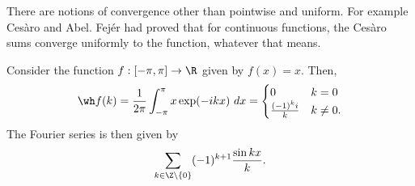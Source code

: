 There are notions of convergence other than pointwise and uniform. For example Ces\`aro and Abel. Fej\'er had proved that for continuous functions, the Ces\`aro sums converge uniformly to the function, whatever that means.

\begin{example}
    Consider the function $f:[-\pi,\pi]\to\R$ given by $f(x) = x$. Then, 
    \begin{equation*}
        \wh f(k) = \frac{1}{2\pi}\int_{-\pi}^\pi x\exp(-ikx)~dx = 
        \begin{cases}
            0 & k = 0\\
            \frac{(-1)^ki}{k} & k\ne 0.
        \end{cases}
    \end{equation*}
    The Fourier series is then given by 
    \begin{equation*}
        \sum_{k\in\Z\backslash\{0\}}(-1)^{k + 1}\frac{\sin kx}{k}.
    \end{equation*}
\end{example}